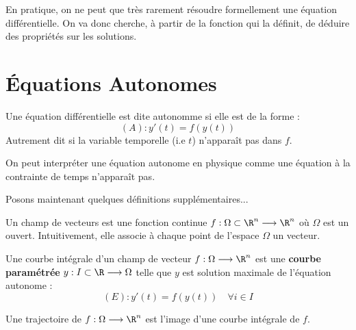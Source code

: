 
\minitoc  %

En pratique, on ne peut que très rarement résoudre formellement une équation différentielle. 
On va donc cherche, à partir de la fonction qui la définit, de déduire des propriétés sur les solutions. 


\section{Équations Autonomes}

\begin{definition}
    Une équation différentielle est dite autonomme si elle est de la forme : 
        \[ (A) : y'(t) = f(y(t)) \] 
    Autrement dit si la variable temporelle (i.e $t$) n'apparaît pas dans $f$. 
\end{definition}

On peut interpréter une équation autonome en physique comme une équation à la contrainte de temps n'apparaît pas. 

Posons maintenant quelques définitions supplémentaires... 

\begin{definition}
    Un champ de vecteurs est une fonction continue $f : \Omega \subset \R^n \longrightarrow \R^n$ où $\Omega$ est un ouvert. 
    Intuitivement, elle associe à chaque point de l'espace $\Omega$ un vecteur. 
\end{definition}

\begin{definition}
    Une courbe intégrale d'un champ de vecteur $f : \Omega \longrightarrow \R^n$ est une \textbf{courbe paramétrée} 
    $y : I \subset \R \longrightarrow \Omega$ telle que $y$ est solution maximale de l'équation autonome :
        \[ (E) : y'(t) = f(y(t)) \quad \forall i \in I \] 
\end{definition}

\begin{definition}[Trajectoire]
    Une trajectoire de $f : \Omega \longrightarrow \R^n$ est l'image d'une courbe intégrale de $f$. 
\end{definition}

